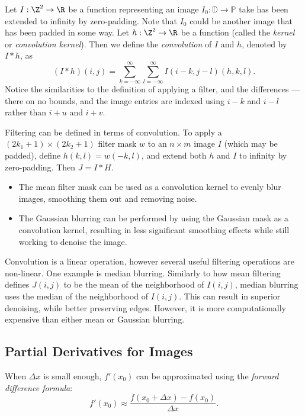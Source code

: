 \documentclass[12pt]{article}
\begin{document}
\begin{defn}
    Let $I: \Z^2 \to \R$ be a function representing an image $I_0: \mathbb{D} \to \mathbb{P}$ take has been extended to infinity by zero-padding. Note that $I_0$ could be another image that has been padded in some way. Let $h: \Z^2 \to \R$ be a function (called the \emph{kernel} or \emph{convolution kernel}). Then we define the \emph{convolution} of $I$ and $h$, denoted by $I * h$, as \[(I * h)(i, j) = \sum_{k=-\infty}^{\infty}\sum_{l=-\infty}^{\infty}I(i - k, j - l)(h, k, l).\] Notice the similarities to the definition of applying a filter, and the differences --- there on no bounds, and the image entries are indexed using $i - k$ and $i - l$ rather than $i + u$ and $i + v$.
\end{defn}

Filtering can be defined in terms of convolution. To apply a $(2k_1 + 1) \times (2k_2 + 1)$ filter mask $w$ to an $n \times m$ image $I$ (which may be padded), define $h(k, l) = w(-k, l)$, and extend both $h$ and $I$ to infinity by zero-padding. Then $J = I * H$.

\begin{exmp}\proofbreak
    \begin{itemize}
        \item The mean filter mask can be used as a convolution kernel to evenly blur images, smoothing them out and removing noise.
        \item The Gaussian blurring can be performed by using the Gaussian mask as a convolution kernel, resulting in less significant smoothing effects while still working to denoise the image.
    \end{itemize}
\end{exmp}

Convolution is a linear operation, however several useful filtering operations are non-linear. One example is median blurring. Similarly to how mean filtering defines $J(i, j)$ to be the mean of the neighborhood of $I(i, j)$, median blurring uses the median of the neighborhood of $I(i, j)$. This can result in superior denoising, while better preserving edges. However, it is more computationally expensive than either mean or Gaussian blurring.

\subsection{Partial Derivatives for Images}

\begin{defn}
    When $\Delta x$ is small enough, $f'(x_0)$ can be approximated using the \emph{forward difference formula}: \[f'(x_0) \approx \frac{f(x_0 + \Delta x) - f(x_0)}{\Delta x}.\]
\end{defn}
\end{document}
